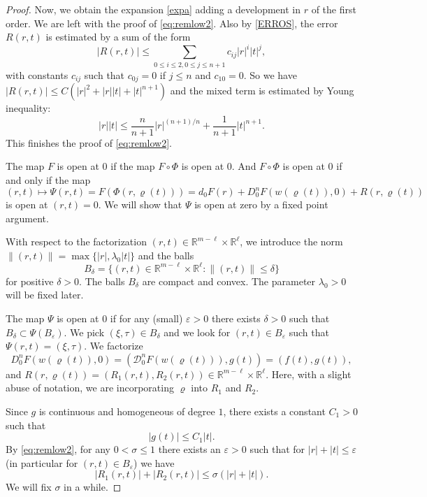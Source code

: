 \documentclass[12pt, reqno]{amsart}
\theoremstyle{plain}
\theoremstyle{definition}
\theoremstyle{remark}
\numberwithin{equation}{section}
\newcommand{\R}{\mathbb{R}}
\newcommand{\0}{\theta}
\newcommand{\1}{{-1}}
\renewcommand{\l}{\ell}
\renewcommand{\=}{\coloneqq}
\renewcommand{\.}{\dots}
\newcommand{\mc}{\mathcal}
\begin{document}
\begin{proof}
  	
Now, we obtain the expansion \eqref{expa} adding  a development in $r$ of the first order.
We are left with the proof of  \eqref{eq:remlow2}. Also by \eqref{ERROS}, the error $R(r,t)$ is estimated by a sum of the form
\[
| R(r,t)|\leq  \sum_{0\leq i \leq 2, 0\leq j \leq n+1  } c_{ij} |r|^i |t|^j,
\]
with constants $c_{ij}$ such that  $c_{0j}=0$ if $j\leq n$ and $c_{10}=0$. So we have $| R(r,t)|\leq  C(|r|^2 +|r| |t| +|t|^{n+1})$ and   the mixed term is estimated by Young inequality:
\[
 |r| |t|\leq \frac{n}{n+1} |r|^{(n+1)/n} + \frac{1}{n+1}   |t|^{n+1}.
\]
This finishes the proof of  \eqref{eq:remlow2}.



 

The map $F$ is open at $0$ if the map   $F\circ\Phi$ is open at $0$. And $F\circ\Phi$ is open at $0$
 if and only if the map
\[
(r,t)\mapsto 
\Psi(r,t)= F( \Phi (r,\varrho(t)))= d_0 F(r) + D_0^n F (w(\varrho(t)),0)  +R(r,\varrho(t))
\]
 is open at $(r,t)=0$. We will show that $\Psi$ is open at zero by a fixed point argument.
 
 
 With respect to the factorization   $(r,t) \in \R^{m-\l}\times \R^\l$, we introduce the norm $\| (r,t)\| = \max\{ |r|, \lambda_0 |t|\}$ and the balls \[
 B_\delta =\{
 (r,t) \in \R^{m-\l}\times \R^\l: \| (r,t)\|\leq \delta\}
 \]
  for positive $\delta>0$. The balls $B_\delta$ are compact and convex.
 The parameter $\lambda _0>0$ will be fixed later.
 
 The map $\Psi$ is open at $0$ if for any (small) $\varepsilon>0$
 there exists $\delta>0$ such that $B_\delta \subset \Psi(B_\varepsilon)$. 
 We pick $(\xi,\tau) \in B_\delta$ and we look for $(r,t)\in B_\varepsilon$ such that $\Psi(r,t) =(\xi,\tau)$.
 We factorize
 \[
 D_0^n F (w(\varrho(t)),0)  = (\mc D_0^n F (w(\varrho(t))), g(t)) = (f(t), g(t)),
 \]
 and $R(r,\varrho(t))= (R_1 (r,t),R_2(r,t) )\in \R^{m-\l}\times \R^\l$. Here, with a slight abuse of notation, we are incorporating $\varrho$ into $R_1$ and $R_2$.
 
 
 Since $g$ is continuous and homogeneous of degree $1$, there exists a constant $C_1>0$ such that
 \begin{equation}
 \label{piffero}
   |g(t)| \leq C_1 |t|.
 \end{equation}
 By  \eqref{eq:remlow2}, for any $0<\sigma\leq 1$ there exists an $\varepsilon>0$ such that for $|r|+|t|\leq \varepsilon$ (in particular for $(r,t) \in B_\varepsilon$)
 we have
 \begin{equation}
 \label{vix}
 |R_1 (r,t)|+| R_2(r,t)|\leq \sigma( |r|+|t|).  
 \end{equation}
 We will fix $\sigma$ in a while.
 

\end{proof}
\end{document}
